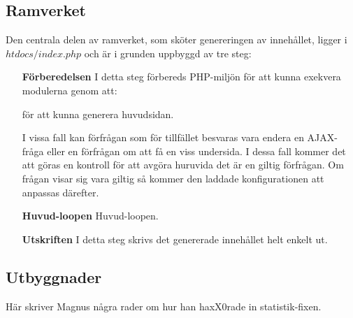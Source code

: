 \subsection{Ramverket}
Den centrala delen av ramverket, som sköter genereringen av innehållet, ligger
i $htdocs/index.php$ och är i grunden uppbyggd av tre steg:

\begin{itemize}
  \item[\bf Förberedelsen]
    I detta steg förbereds PHP-miljön för att kunna exekvera modulerna genom
    att:
    för att kunna generera huvudsidan.

    I vissa fall kan förfrågan som för tillfället besvaras vara endera en
    AJAX-fråga eller en förfrågan om att få en viss undersida. I dessa fall
    kommer det att göras en kontroll för att avgöra huruvida det är en giltig
    förfrågan. Om frågan visar sig vara giltig så kommer den laddade
    konfigurationen att anpassas därefter.
  \item[\bf Huvud-loopen]
    Huvud-loopen.

  \item[\bf Utskriften]
    I detta steg skrivs det genererade innehållet helt enkelt ut.
\end{itemize}

\subsection{Utbyggnader}
Här skriver Magnus några rader om hur han haxX0rade in statistik-fixen.

